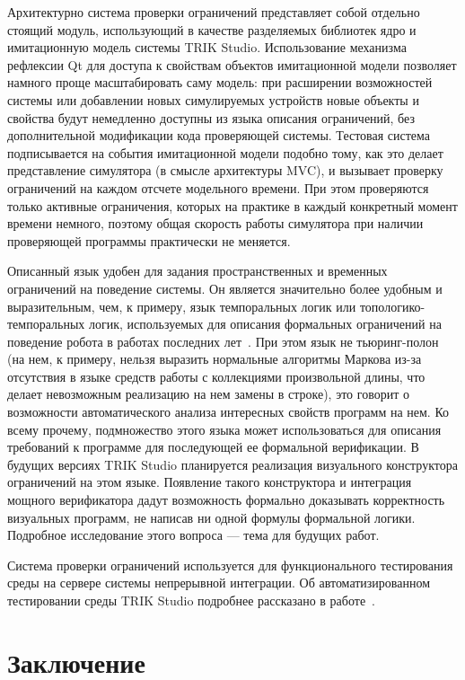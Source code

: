 \documentclass[a5paper]{article}
\begin{document}
Архитектурно система проверки ограничений представляет собой отдельно стоящий модуль, использующий в качестве разделяемых библиотек ядро и имитационную модель системы TRIK Studio. Использование механизма рефлексии Qt для доступа к свойствам объектов имитационной модели позволяет намного проще масштабировать саму модель: при расширении возможностей системы или добавлении новых симулируемых устройств новые объекты и свойства будут немедленно доступны из языка описания ограничений, без дополнительной модификации кода проверяющей системы. Тестовая система подписывается на события имитационной модели подобно тому, как это делает представление симулятора (в смысле архитектуры MVC), и вызывает проверку ограничений на каждом отсчете модельного времени. При этом проверяются только активные ограничения, которых на практике в каждый конкретный момент времени немного, поэтому общая скорость работы симулятора при наличии проверяющей программы практически не меняется.

Описанный язык удобен для задания пространственных и временных ограничений на поведение системы. Он является значительно более удобным и выразительным, чем, к примеру, язык темпоральных логик или топологико-темпоральных логик, используемых для описания формальных ограничений на поведение робота в работах последних лет~\cite{mordvinov2016formal,kress2007s,бугайченко2007разработка,дмитриев2013адаптация}. При этом язык не тьюринг-полон (на нем, к примеру, нельзя выразить нормальные алгоритмы Маркова из-за отсутствия в языке средств работы с коллекциями произвольной длины, что делает невозможным реализацию на нем замены в строке), это говорит о возможности автоматического анализа интересных свойств программ на нем. Ко всему прочему, подмножество этого языка может использоваться для описания требований к программе для последующей ее формальной верификации. В будущих версиях TRIK Studio планируется реализация визуального конструктора ограничений на этом языке. Появление такого конструктора и интеграция мощного верификатора дадут возможность формально доказывать корректность визуальных программ, не написав ни одной формулы формальной логики. Подробное исследование этого вопроса --- тема для будущих работ.

Система проверки ограничений используется для функционального тестирования среды на сервере системы непрерывной интеграции. Об автоматизированном тестировании среды TRIK Studio подробнее рассказано в работе~\cite{mordvinov2016testing}.

\section*{Заключение}
\label{chapter:conclusion}
\end{document}
